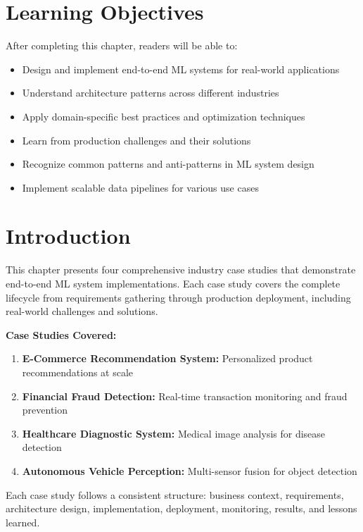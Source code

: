 \section{Learning Objectives}

After completing this chapter, readers will be able to:
\begin{itemize}
    \item Design and implement end-to-end ML systems for real-world applications
    \item Understand architecture patterns across different industries
    \item Apply domain-specific best practices and optimization techniques
    \item Learn from production challenges and their solutions
    \item Recognize common patterns and anti-patterns in ML system design
    \item Implement scalable data pipelines for various use cases
\end{itemize}

\section{Introduction}

This chapter presents four comprehensive industry case studies that demonstrate end-to-end ML system implementations. Each case study covers the complete lifecycle from requirements gathering through production deployment, including real-world challenges and solutions.

\textbf{Case Studies Covered:}

\begin{enumerate}
    \item \textbf{E-Commerce Recommendation System:} Personalized product recommendations at scale
    \item \textbf{Financial Fraud Detection:} Real-time transaction monitoring and fraud prevention
    \item \textbf{Healthcare Diagnostic System:} Medical image analysis for disease detection
    \item \textbf{Autonomous Vehicle Perception:} Multi-sensor fusion for object detection
\end{enumerate}

Each case study follows a consistent structure: business context, requirements, architecture design, implementation, deployment, monitoring, results, and lessons learned.

